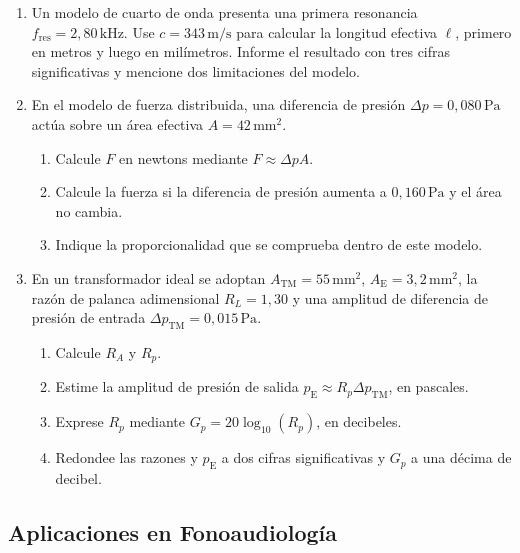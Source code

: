 \begin{enumerate}[label=\textbf{N\arabic*.},leftmargin=*]
    \item Un modelo de cuarto de onda presenta una primera resonancia
    \(f_\mathrm{res}=2{,}80\,\text{kHz}\). Use
    \(c=343\,\text{m}/\text{s}\) para calcular la longitud efectiva
    \(\ell\), primero en metros y luego en milímetros. Informe el resultado
    con tres cifras significativas y mencione dos limitaciones del modelo.

    \item En el modelo de fuerza distribuida, una diferencia de presión
    \(\Delta p=0{,}080\,\text{Pa}\) actúa sobre un área efectiva
    \(A=42\,\text{mm}^2\).
    \begin{enumerate}[label=\alph*)]
        \item Calcule \(F\) en newtons mediante \(F\approx\Delta pA\).
        \item Calcule la fuerza si la diferencia de presión aumenta a
        \(0{,}160\,\text{Pa}\) y el área no cambia.
        \item Indique la proporcionalidad que se comprueba dentro de este
        modelo.
    \end{enumerate}

    \item En un transformador ideal se adoptan
    \(A_\mathrm{TM}=55\,\text{mm}^2\),
    \(A_\mathrm{E}=3{,}2\,\text{mm}^2\), la razón de palanca adimensional
    \(R_L=1{,}30\) y una amplitud de diferencia de presión de entrada
    \(\Delta p_\mathrm{TM}=0{,}015\,\text{Pa}\).
    \begin{enumerate}[label=\alph*)]
        \item Calcule \(R_A\) y \(R_p\).
        \item Estime la amplitud de presión de salida
        \(p_\mathrm{E}\approx R_p\Delta p_\mathrm{TM}\), en pascales.
        \item Exprese \(R_p\) mediante
        \(G_p=20\log_{10}(R_p)\), en decibeles.
        \item Redondee las razones y \(p_\mathrm{E}\) a dos cifras
        significativas y \(G_p\) a una décima de decibel.
    \end{enumerate}
\end{enumerate}

\subsection*{Aplicaciones en Fonoaudiología}

